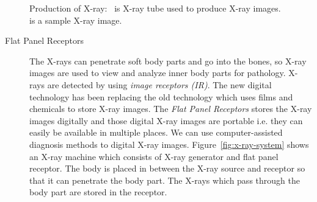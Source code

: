 \begin{figure}%
\centering
{}%
\caption[Production of X-ray]{Production of X-ray:~ is X-ray tube used to produce X-ray images.~ is a sample X-ray image.}
\end{figure}
\begin{description}
\item[Flat Panel Receptors] The X-rays can penetrate soft body parts and go into the bones, so X-ray images are used to view and analyze inner body parts for pathology. X-rays are detected by using \textit{image receptors (IR)}. The new digital technology has been replacing the old technology which uses films and chemicals to store X-ray images. The \emph{Flat Panel Receptors} stores the X-ray images digitally and those digital X-ray images are portable i.e. they can easily be available in multiple places. We can use computer-assisted diagnosis methods to digital X-ray images. Figure~\ref{fig:x-ray-system} shows an X-ray machine which consists of X-ray generator and flat panel receptor. The body is placed in between the X-ray source and receptor so that it can penetrate the body part. The X-rays which pass through the body part are stored in the receptor.
\end{description}


